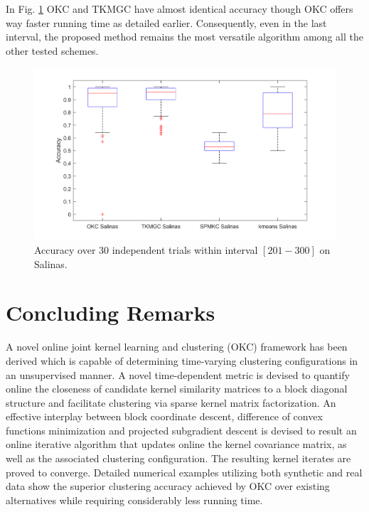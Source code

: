 \documentclass[10pt,final]{IEEEtran}
\begin{document}
In Fig. \ref{Fig:14} OKC and TKMGC have almost identical accuracy though OKC offers way faster running time  as detailed earlier. Consequently, even in the last interval, the proposed method remains the most versatile algorithm among all the other tested schemes. 
\begin{figure}[htp]
    \centering
    \includegraphics[scale=0.18]{boxplot_4_methods_Salinas_201-300.png}
    \caption{Accuracy over 30 independent trials within interval $[201-300]$ on Salinas.}
    \label{Fig:14}
\end{figure}

\section{Concluding Remarks}
A novel online joint kernel learning and clustering (OKC) framework has been derived which is capable of determining time-varying clustering configurations in an unsupervised manner. A novel time-dependent metric is devised to quantify online the closeness of candidate kernel similarity matrices to a block diagonal structure and facilitate clustering via sparse kernel matrix factorization. An effective interplay between block coordinate descent, difference of convex functions minimization and projected subgradient descent is devised to result an online iterative algorithm that updates online the kernel covariance matrix, as well as the associated clustering configuration. The resulting kernel iterates are proved to converge. Detailed numerical examples utilizing both synthetic and real data show the superior clustering accuracy achieved by OKC over existing alternatives while requiring considerably less running time.
\end{document}
